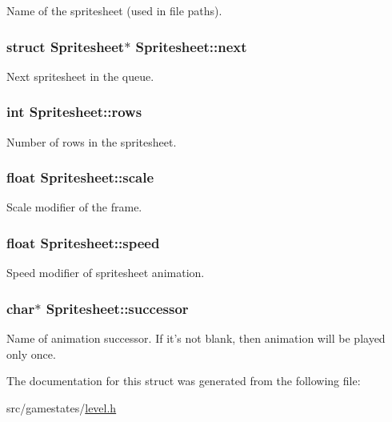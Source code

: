 Name of the spritesheet (used in file paths). \hypertarget{structSpritesheet_a671f77f759138aa2c852e5252b6daac5}{
\subsubsection[{next}]{\setlength{\rightskip}{0pt plus 5cm}struct {\bf Spritesheet}$\ast$ Spritesheet\+::next}}\label{structSpritesheet_a671f77f759138aa2c852e5252b6daac5}
Next spritesheet in the queue. \hypertarget{structSpritesheet_aeab321ce6cdd45cc8a5078e80480510e}{
\subsubsection[{rows}]{\setlength{\rightskip}{0pt plus 5cm}int Spritesheet\+::rows}}\label{structSpritesheet_aeab321ce6cdd45cc8a5078e80480510e}
Number of rows in the spritesheet. \hypertarget{structSpritesheet_ac46cf3d01609f66aae140e3b7d3d1109}{
\subsubsection[{scale}]{\setlength{\rightskip}{0pt plus 5cm}float Spritesheet\+::scale}}\label{structSpritesheet_ac46cf3d01609f66aae140e3b7d3d1109}
Scale modifier of the frame. \hypertarget{structSpritesheet_ad011770ca540de2bad85f0cb155c774b}{
\subsubsection[{speed}]{\setlength{\rightskip}{0pt plus 5cm}float Spritesheet\+::speed}}\label{structSpritesheet_ad011770ca540de2bad85f0cb155c774b}
Speed modifier of spritesheet animation. \hypertarget{structSpritesheet_a8132723c6e2d6b939b11852062eefe67}{
\subsubsection[{successor}]{\setlength{\rightskip}{0pt plus 5cm}char$\ast$ Spritesheet\+::successor}}\label{structSpritesheet_a8132723c6e2d6b939b11852062eefe67}
Name of animation successor. If it's not blank, then animation will be played only once. 

The documentation for this struct was generated from the following file\+:\begin{DoxyCompactItemize}
\item 
src/gamestates/\hyperlink{level_8h}{level.\+h}\end{DoxyCompactItemize}
